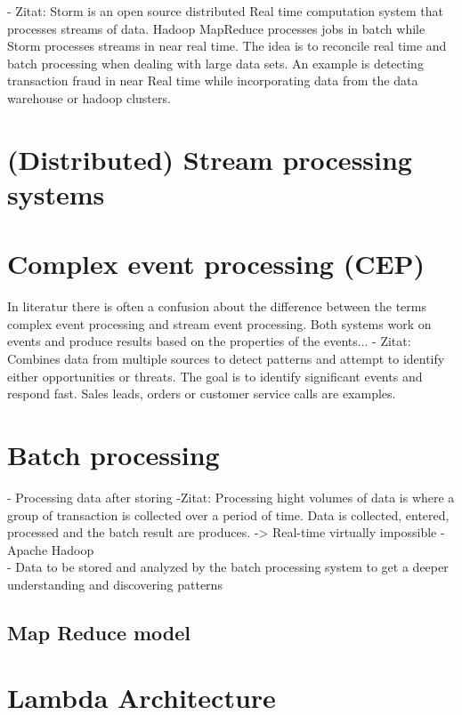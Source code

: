- Zitat: Storm is an open source distributed Real time computation system that
processes streams of data. Hadoop MapReduce processes jobs in batch while
Storm processes streams in near real time. The idea is to reconcile real time
and batch processing when dealing with large data sets. An example is detecting
transaction fraud in near Real time while incorporating data from the data
warehouse or hadoop clusters.\\

\section{(Distributed) Stream processing systems}

\section{Complex event processing (CEP)}
In literatur there is often a confusion about the difference between the terms
complex event processing and stream event processing. Both systems work on
events and produce results based on the properties of the events... 
- Zitat: Combines data from multiple sources  to detect patterns and attempt to
identify either opportunities or threats. The goal is to identify significant
events and respond fast. Sales leads, orders or customer service calls are
examples.\\


\section{Batch processing}
- Processing data after storing 
-Zitat: Processing hight volumes of data is where a group of transaction is collected
over a period of time. Data is collected, entered, processed and the batch
result are produces. -> Real-time virtually impossible
- Apache Hadoop\\
- Data to be stored and analyzed by the batch processing system to get a deeper
understanding and discovering patterns
\subsection{Map Reduce model }

\section{Lambda Architecture}
\cite{PrpSvyOfDSPS}

